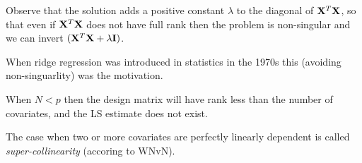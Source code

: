 \documentclass[
  ignorenonframetext,
]{beamer}
\begin{document}
\begin{frame}

Observe that the solution adds a positive constant \(\lambda\) to the
diagonal of \({\bf X}^T{\bf X}\), so that even if \({\bf X}^T{\bf X}\)
does not have full rank then the problem is non-singular and we can
invert \(({\bf X}^T{\bf X}+\lambda {\bf I})\).

When ridge regression was introduced in statistics in the 1970s this
(avoiding non-singuarlity) was the motivation.

When \(N<p\) then the design matrix will have rank less than the number
of covariates, and the LS estimate does not exist.

The case when two or more covariates are perfectly linearly dependent is
called \emph{super-collinearity} (accoring to WNvN).

\end{frame}

\begin{frame}

\end{frame}
\end{document}
